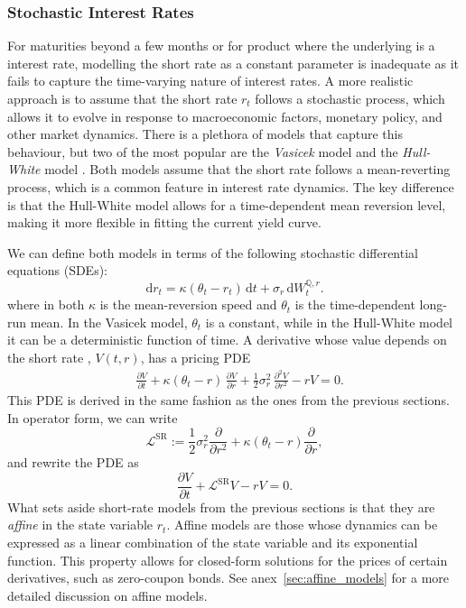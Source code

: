 \documentclass[12pt]{report} %
\theoremstyle{plain}           %
\theoremstyle{definition}      %
\theoremstyle{remark}          %
\begin{document}
\subsubsection{Stochastic Interest Rates}

For maturities beyond a few months or for product where the underlying is a interest rate, modelling the short rate as a
constant parameter is inadequate \cite{brigo2013interest} as it fails to capture the
time-varying nature of interest rates. A more realistic approach is to assume that the
short rate \(r_t\) follows a stochastic process, which allows it to evolve in response
to macroeconomic factors, monetary policy, and other market dynamics.
There is a plethora of models that capture this behaviour, but two of the most popular are the
\emph{Vasicek} model \cite{VASICEK1977177} and the
\emph{Hull-White} model \cite{hullwhitemodel}.  
Both models assume that the short rate follows a mean-reverting process, which is
a common feature in interest rate dynamics.  The key difference is that the Hull-White model
allows for a time-dependent mean reversion level, making it more flexible in fitting the
current yield curve.

We can define both models in terms of the following stochastic differential equations (SDEs):
\begin{equation}\label{eq:vasicek_sde}
  \mathrm{d}r_t
  = \kappa(\theta_t-r_t)\,\mathrm{d}t
    + \sigma_r\,\mathrm{d}W^{\mathbb{Q},r}_t.
\end{equation}
where in both \(\kappa\) is the mean-reversion speed and \(\theta_t\) is the time-dependent long-run mean. 
In the Vasicek model, \(\theta_t\) is a constant, while in the Hull-White model it can be a deterministic 
function of time. A derivative whose value depends on the short rate , $V(t,r)$, has a pricing PDE
\begin{equation}\label{eq:vasicek_pde}
\begin{aligned}
  &\frac{\partial V}{\partial t}
  + \kappa(\theta_t-r)\,\frac{\partial V}{\partial r}
  + \frac12\sigma_r^{2}\,\frac{\partial^{2} V}{\partial r^{2}}
  - rV
  = 0.
\end{aligned}
\end{equation}
This PDE is derived in the same fashion as the ones from the previous sections. In operator form, we can write
\begin{equation}\label{eq:L_SR}
  \mathcal{L}^{\mathrm{SR}}
  := \frac12\sigma_r^{2}\frac{\partial}{\partial r^{2}}
  + \kappa(\theta_t-r)\frac{\partial}{\partial r},
\end{equation}
and rewrite the PDE as
\begin{equation}\label{eq:vasicek_pde_redux}
  \frac{\partial V}{\partial t} + \mathcal{L}^{\mathrm{SR}}V - rV = 0.
\end{equation}
What sets aside short-rate models from the previous sections is that they are \emph{affine} in the state variable \(r_t\).
Affine models are those whose dynamics can be expressed as a linear combination of the state variable and its
exponential function. This property allows for closed-form solutions for the prices of certain derivatives, 
such as zero-coupon bonds. See anex~\ref{sec:affine_models} for a more detailed discussion on affine models.
\end{document}
